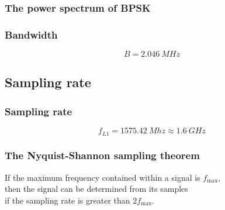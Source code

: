 \documentclass[aspectratio=169]{beamer}
\begin{document}
\begin{frame}
    \frametitle{The power spectrum of BPSK}

    \centering
\end{frame}

\begin{frame}
    \frametitle{Bandwidth}

    \Large
    \[B = \qty{2.046}{MHz}\]
\end{frame}

\subsection{Sampling rate}

\begin{frame}
    \frametitle{Sampling rate}

    \Large
    \[f_{L1} = \qty{1575.42}{Mhz} \approx \qty{1.6}{GHz}\]
\end{frame}

\begin{frame}
    \frametitle{The Nyquist-Shannon sampling theorem}

    \centering
    \Large
    If the maximum frequency contained within a signal is $f_\text{max}$,\\then the signal can be determined from its samples\\if the sampling rate is greater than $2 f_\text{max}$.
\end{frame}
\end{document}
